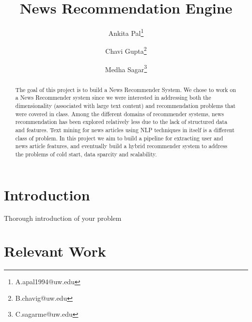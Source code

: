 \documentclass{article}
\title{News Recommendation Engine}
\author[1]{Ankita Pal\thanks{A.apal1994@uw.edu}}
\author[1]{Chavi Gupta\thanks{B.chavig@uw.edu}}
\author[1]{Medha Sagar\thanks{C.sagarme@uw.edu}}
\affil[1]{Department of Data Science, University of Washington}
\begin{document}
\maketitle

\begin{abstract}
    The goal of this project is to build a News Recommender System. We chose to work on a News Recommender system since we were interested in addressing both the dimensionality (associated with large text content) and recommendation problems that were covered in class. Among the different domains of recommender systems, news recommendation has been explored relatively less due to the lack of structured data and features. Text mining for news articles using NLP techniques in itself is a different class of problem. In this project we aim to build a pipeline for extracting user and news article features, and eventually build a hybrid recommender system to address the problems of cold start, data sparcity and scalability. 
\end{abstract}

\section{Introduction}

{Thorough introduction of your problem}

\section{Relevant Work}
\end{document}
